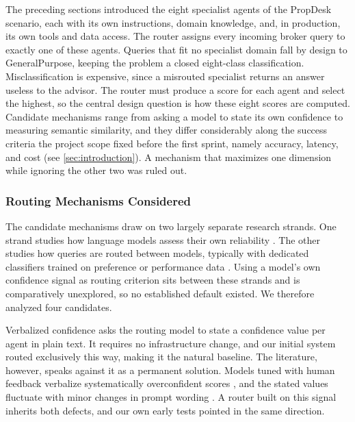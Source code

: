 \label{sec:router}

The preceding sections introduced the eight specialist agents of the PropDesk scenario, each with its own instructions, domain knowledge, and, in production, its own tools and data access. The router assigns every incoming broker query to exactly one of these agents. Queries that fit no specialist domain fall by design to GeneralPurpose, keeping the problem a closed eight-class classification. Misclassification is expensive, since a misrouted specialist returns an answer useless to the advisor. The router must produce a score for each agent and select the highest, so the central design question is how these eight scores are computed. Candidate mechanisms range from asking a model to state its own confidence to measuring semantic similarity, and they differ considerably along the success criteria the project scope fixed before the first sprint, namely accuracy, latency, and cost (see \cref{sec:introduction}). A mechanism that maximizes one dimension while ignoring the other two was ruled out.

\subsubsection{Routing Mechanisms Considered}\label{sec:router-mechanisms}

The candidate mechanisms draw on two largely separate research strands. One strand studies how language models assess their own reliability \autocite{kadavath2022,tian2023,xiong2024}. The other studies how queries are routed between models, typically with dedicated classifiers trained on preference or performance data \autocite{ong2024,chen2023}. Using a model's own confidence signal as routing criterion sits between these strands and is comparatively unexplored, so no established default existed. We therefore analyzed four candidates.

Verbalized confidence asks the routing model to state a confidence value per agent in plain text. It requires no infrastructure change, and our initial system routed exclusively this way, making it the natural baseline. The literature, however, speaks against it as a permanent solution. Models tuned with human feedback verbalize systematically overconfident scores \autocite{tian2023}, and the stated values fluctuate with minor changes in prompt wording \autocite{xiong2024}. A router built on this signal inherits both defects, and our own early tests pointed in the same direction.

